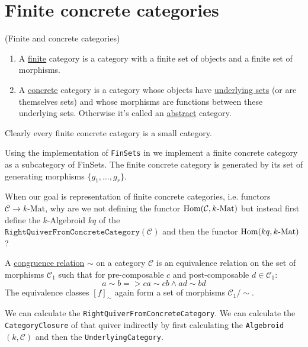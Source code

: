 
\section{Finite concrete categories}

\begin{definition}{(Finite and concrete categories)}
\renewcommand{\labelenumi}{(\theenumi)}
\begin{enumerate}
\item A \ul{finite} category is a category with a finite set of objects and a finite set of morphisms.
\item A \ul{concrete} category is a category whose objects have \ul{underlying sets} (or are themselves sets) and whose morphisms are
functions between these underlying sets. Otherwise it's called an \ul{abstract} category.
\end{enumerate}
\end{definition}

\noindent Clearly every finite concrete category is a small category.

\begin{remark}[Implementation]
Using the implementation of \texttt{FinSets} in %
we implement a finite concrete category as a subcategory of FinSets.
The finite concrete category is generated by its set of generating morphisms $\{g_{1},\dots,g_{r}\}$.
\end{remark}

When our goal is representation of finite concrete categories, i.e. functors $\mathcal{C} \rightarrow k\text{-Mat}$, why are we not
defining the functor $\textup{Hom}(\mathcal{C},k\text{-Mat})$ but instead first define the $k$-Algebroid $kq$ of the\\
$\texttt{RightQuiverFromConcreteCategory}(\mathcal{C})$ and then the functor $\textup{Hom}(kq,k\textup{-Mat})$?

\begin{definition}
A \ul{congruence relation} $\sim$ on a category $\mathcal{C}$ is an equivalence relation on the set of morphisms $\mathcal{C}_{1}$ such that
for pre-composable $c$ and post-composable $d \in \mathcal{C}_{1}$:
\[ a \sim b => ca \sim cb \land ad \sim bd \]
The equivalence classes $[f]_{\sim}$ again form a set of morphisms $\mathcal{C}_{1}/\sim$.
\end{definition}

We can calculate the \texttt{RightQuiverFromConcreteCategory}. We can calculate the \texttt{CategoryClosure} of that quiver indirectly by first
calculating the \texttt{Algebroid}$( k, \mathcal{C} )$ and then the \texttt{UnderlyingCategory}.


